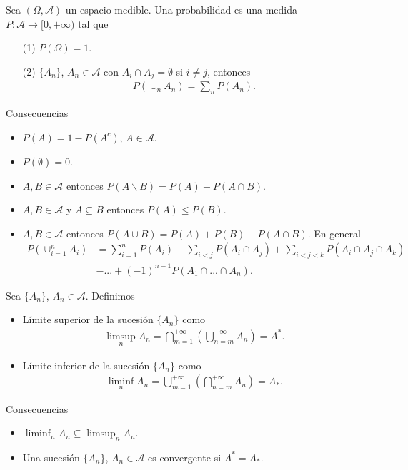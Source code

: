 \begin{defi}
    Sea $(\Omega, \mathcal{A})$ un espacio medible. Una probabilidad es una medida $P: \mathcal{A} \longrightarrow [0,+\infty)$ tal que
    \begin{enumerate}
        \item[(1)] $P(\Omega) = 1$.
        \item[(2)] $\{A_n\}$, $A_n \in \mathcal{A}$ con $A_i \cap A_j = \emptyset$ si $i \not = j$, entonces
              \begin{align*}
                  P(\cup_{n}{A_n}) = \sum_{n}{P(A_n)}.
              \end{align*}
    \end{enumerate}
    Consecuencias
    \begin{itemize}
        \item $P(A) = 1 - P(A^c)$, $A \in \mathcal{A}$.
        \item $P(\emptyset) = 0$.
        \item $A, B \in \mathcal{A}$ entonces $P(A \backslash B) = P(A) - P(A \cap B)$.
        \item $A, B \in \mathcal{A}$ y $A \subseteq B$ entonces $P(A) \leq P(B)$.
        \item $A, B \in \mathcal{A}$ entonces $P(A \cup B) = P(A) + P(B) - P(A \cap B)$. En general
              \begin{align*}
                  P(\cup_{i=1}^{n}{A_i}) & = \sum_{i=1}^{n}{P(A_i)} - \sum_{i < j}{P(A_i \cap A_j)} + \sum_{i< j < k}{P(A_i \cap A_j \cap A_k)} \\
                                         & - ... + (-1)^{n-1}P(A_1 \cap ... \cap A_n).
              \end{align*}
    \end{itemize}
\end{defi}

\begin{defi}
    Sea $\{A_n\}$, $A_n \in \mathcal{A}$. Definimos
    \begin{itemize}
        \item Límite superior de la sucesión $\{A_n\}$ como
              \begin{align*}
                  \limsup_{n}{A_n} = \bigcap_{m=1}^{+\infty}{\left(\bigcup_{n=m}^{+\infty}{A_n}\right)} = A^*.
              \end{align*}
        \item Límite inferior de la sucesión $\{A_n\}$ como
              \begin{align*}
                  \liminf_{n}{A_n} = \bigcup_{m=1}^{+\infty}{\left(\bigcap_{n=m}^{+\infty}{A_n}\right)} = A_*.
              \end{align*}
    \end{itemize}
    Consecuencias
    \begin{itemize}
        \item $\liminf_{n}{A_n} \subseteq \limsup_{n}{A_n}$.
        \item Una sucesión $\{A_n\}$, $A_n \in \mathcal{A}$ es convergente si $A^* = A_*$.
    \end{itemize}
\end{defi}

